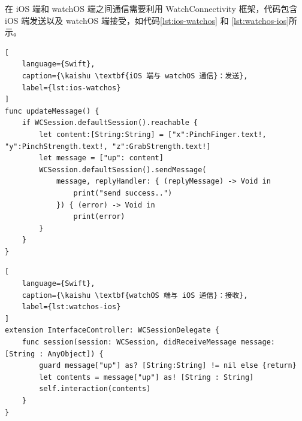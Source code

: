 在 iOS 端和 watchOS 端之间通信需要利用 WatchConnectivity 框架，代码包含 iOS 端发送以及 watchOS 端接受，如代码\ref{lst:ios-watchos} 和 \ref{lst:watchos-ios}所示。

\begin{lstlisting}[
    language={Swift},
    caption={\kaishu \textbf{iOS 端与 watchOS 通信}：发送},
    label={lst:ios-watchos}
]
func updateMessage() {
    if WCSession.defaultSession().reachable {
        let content:[String:String] = ["x":PinchFinger.text!, "y":PinchStrength.text!, "z":GrabStrength.text!]
        let message = ["up": content]
        WCSession.defaultSession().sendMessage(
            message, replyHandler: { (replyMessage) -> Void in
                print("send success..")
            }) { (error) -> Void in
                print(error)
        }
    }
}
\end{lstlisting}
\begin{lstlisting}[
    language={Swift},
    caption={\kaishu \textbf{watchOS 端与 iOS 通信}：接收},
    label={lst:watchos-ios}
]
extension InterfaceController: WCSessionDelegate {
    func session(session: WCSession, didReceiveMessage message: [String : AnyObject]) {
        guard message["up"] as? [String:String] != nil else {return}
        let contents = message["up"] as! [String : String]
        self.interaction(contents)
    }
}
\end{lstlisting}
